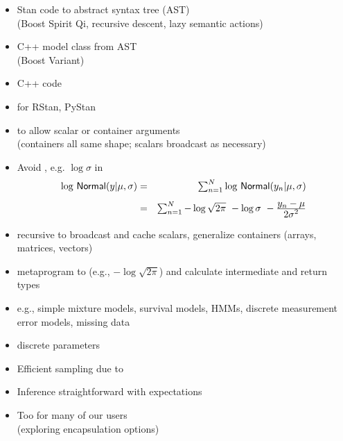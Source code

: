 \documentclass[10pt]{report}
\newcommand{\sld}[1]{\newpage{\noindent\LARGE \ \ \
    \textcolor{MidnightBlue}{\bfseries #1}}\vspace*{4pt}}
\newcommand{\myemph}[1]{{\color{MidnightBlue}{\bfseries #1}}}
\begin{document}
\sld{Parsing and Compilation}
\begin{itemize}
\item Stan code \myemph{parsed} to abstract syntax tree (AST)
\\ {\footnotesize (Boost Spirit Qi, recursive descent, lazy semantic
  actions)}
\item C++ model class \myemph{code generation} from AST
\\ {\footnotesize (Boost Variant)}
\item C++ code \myemph{compilation}
\item \myemph{Dynamic linking} for RStan, PyStan
\end{itemize}

\sld{Coding Probability Functions}
\begin{itemize}
\item \myemph{Vectorized} to allow scalar or container arguments
\\ {\footnotesize (containers all same shape; scalars broadcast as necessary)}
\item Avoid \myemph{repeated computations}, e.g. $\log \sigma$ in
\hspace*{-18pt}
{\small
\begin{eqnarray*}
\textstyle \log \, \mbox{\sf Normal}(y | \mu, \sigma)
& = & \textstyle \sum_{n=1}^N \log \, \mbox{\sf Normal}(y_n | \mu,\sigma)
\\[4pt]
& = & \textstyle \sum_{n=1}^N  - \log \sqrt{2\pi} \ - \log \sigma \ -
\frac{\textstyle y_n - \mu}{\textstyle 2\sigma^2}
\end{eqnarray*}
}
\item recursive \myemph{expression templates} to broadcast and cache scalars,
generalize containers (arrays, matrices, vectors)
\item \myemph{traits} metaprogram to \myemph{drop constants} (e.g., $-\log
  \sqrt{2 \pi}$) and calculate intermediate and return types
\end{itemize}

\sld{Models with Discrete Parameters}
\begin{itemize}
\item e.g., simple mixture models, survival models, HMMs,
      discrete measurement error models, missing data
\item \myemph{Marginalize out} discrete parameters
\item Efficient sampling due to \myemph{Rao-Blackwellization}
\item Inference straightforward with expectations
\vspace*{12pt}
\item Too \myemph{difficult} for many of our users
\\
{\small (exploring encapsulation options)}
\end{itemize}
\end{document}
